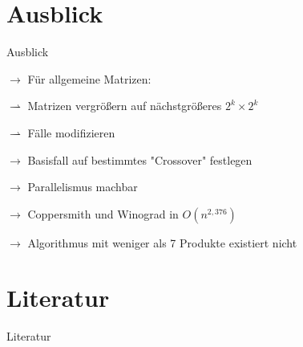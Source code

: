 \documentclass[aspectratio=169]{beamer}
\begin{document}
\section{Ausblick}
\begin{frame}{Ausblick}\uncover<+-> {

    $\rightarrow$ Für allgemeine Matrizen:
    
    \qquad $\rightharpoonup$ Matrizen vergrößern auf nächstgrößeres $2^k \times 2^k$
    
    \qquad $\rightharpoonup$ Fälle modifizieren}
    \uncover<+-> {
    
    \bigskip
    $\rightarrow$ Basisfall auf bestimmtes "Crossover" festlegen
    
    \bigskip
    }
    \uncover<+-> {
    
    $\rightarrow$ Parallelismus machbar
    }
    \bigskip
    \uncover<+-> {
    
    $\rightarrow$ Coppersmith und Winograd in $O(n^{2,376})$ \cite{10.5555/1614191 }
    }
    \bigskip
    \uncover<+-> {
    
    $\rightarrow$ Algorithmus mit weniger als 7 Produkte existiert nicht \cite{https://doi.org/10.48550/arxiv.math/0407224 }}
\end{frame}

\section{Literatur}
\begin{frame}{Literatur}
    \nocite{*}
    
    
\end{frame}
\end{document}
